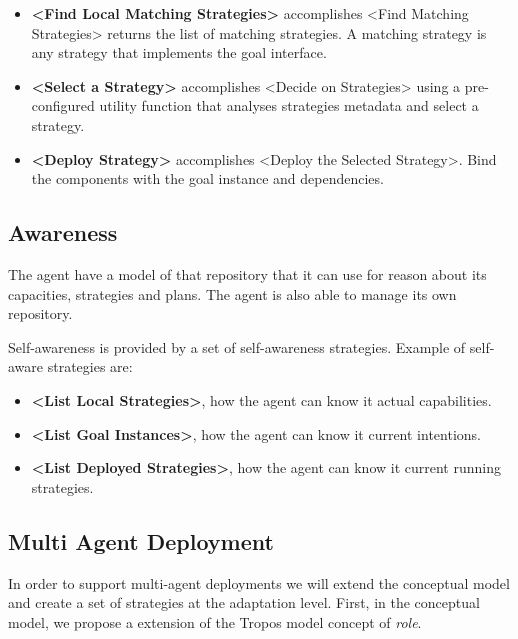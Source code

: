 \begin{itemize}
  \item \textbf{<Find Local Matching Strategies>} accomplishes <Find Matching Strategies>
  returns the list of matching strategies. A matching strategy is any strategy that implements the goal interface.

  \item \textbf{<Select a Strategy>} accomplishes <Decide on Strategies>
  using a pre-configured utility function that analyses strategies metadata and select a strategy.

  \item \textbf{<Deploy Strategy>} accomplishes <Deploy the Selected Strategy>. Bind the components with the goal instance and dependencies.
\end{itemize}

\subsection{Awareness}

The agent have a model of that repository that it can use for reason about its capacities, strategies and plans. The agent is also able to manage its own repository.

Self-awareness is provided by a set of self-awareness strategies. Example of self-aware strategies are:

\begin{itemize}
  \item \textbf{<List Local Strategies>}, how the agent can know it actual capabilities.

  \item \textbf{<List Goal Instances>}, how the agent can know it current intentions.

  \item \textbf{<List Deployed Strategies>}, how the agent can know it current running strategies.

\end{itemize}


\subsection{Multi Agent Deployment}

In order to support multi-agent deployments we will extend the conceptual model and create a set of strategies at the adaptation level. First, in the conceptual model, we propose a extension of the Tropos model concept of \textit{role}.


